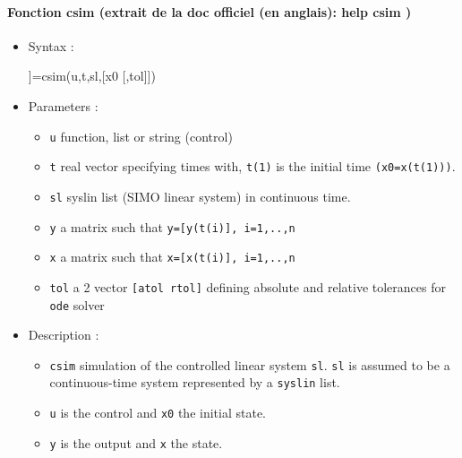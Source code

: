 \paragraph{Fonction csim (extrait de la doc officiel (en anglais): help csim )}
\begin{doc}
\begin{itemize}
    \item Syntax :
    \begin{Scilabcode}
[y [,x]]=csim(u,t,sl,[x0 [,tol]])
    \end{Scilabcode}
    \item Parameters :
    \begin{itemize}
        \item \verb?u?  function, list or string (control)
        \item \verb?t?  real vector specifying times with, \verb?t(1)? is the 
              initial time \verb?(x0=x(t(1)))?.
        \item \verb?sl? syslin list (SIMO linear system) in continuous time.
        \item \verb?y?  a matrix such that \verb?y=[y(t(i)], i=1,..,n?
        \item \verb?x?  a matrix such that \verb?x=[x(t(i)], i=1,..,n?
        \item \verb?tol? a 2 vector \verb?[atol rtol]? defining absolute and 
              relative tolerances for \verb?ode? solver
    \end{itemize}

    \item Description :

    \begin{itemize} 
        \item \verb?csim? simulation of the controlled linear system \verb?sl?.
              \verb?sl? is assumed to be a continuous-time system represented 
              by a \verb?syslin? list.
        \item \verb?u?  is the control and \verb?x0? the initial state.
        \item \verb?y?  is the output and \verb?x? the state.
    \end{itemize}


\end{itemize}
\end{doc}
